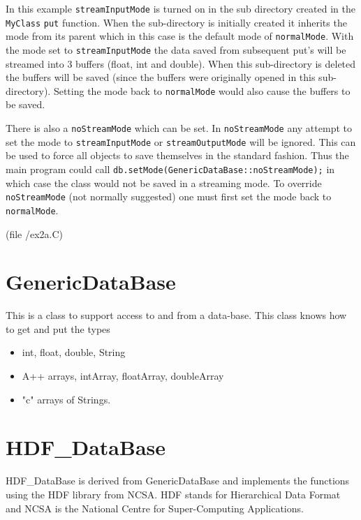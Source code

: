 In this example {\tt streamInputMode} is turned on in the sub directory created
in the {\tt MyClass} {\tt put} function. When the sub-directory is initially created it inherits
the mode from its parent which in this case is the default mode of {\tt normalMode}.
With the mode set to {\tt streamInputMode} the data saved from subsequent put's 
will be streamed into 3 buffers (float, int and double).
When this sub-directory is deleted the buffers will be saved (since the buffers were
originally opened in this sub-directory). 
Setting the mode back to {\tt normalMode} would also cause the buffers to be saved. 


There is also a {\tt noStreamMode}
which can be set. In {\tt noStreamMode} any attempt to set the mode to {\tt streamInputMode} or
{\tt streamOutputMode} will be ignored. 
This can be used
to force all objects to save themselves in the standard fashion. Thus the main program
could call {\tt db.setMode(GenericDataBase::noStreamMode);} in which case the class
would not be saved in a streaming mode.
To override {\tt noStreamMode} (not normally suggested) 
one must first set the mode back to {\tt normalMode}.


(file {\ff \dataBase/ex2a.C})
{\footnotesize
{}
}

\section{GenericDataBase}

 This is a class to support access to and from a data-base.
This class knows how to get and put the types
\begin{itemize}
  \item int, float, double, String
  \item A++ arrays, intArray, floatArray, doubleArray
  \item "c" arrays of Strings.
\end{itemize}



\vfill\eject
\section{HDF\_DataBase}

HDF\_DataBase is derived from GenericDataBase and implements the
functions using the HDF library from NCSA. HDF stands for
Hierarchical Data Format and NCSA is the National Centre for
Super-Computing Applications.


